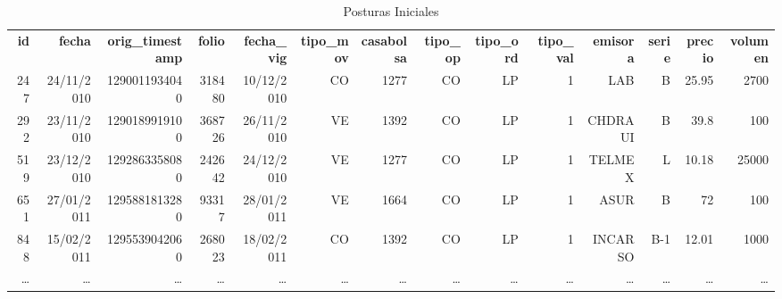 \documentclass[10pt]{article}
\begin{document}
\begin{landscape}

\begin{table}[htbp]\scriptsize
  \centering
  \caption{Posturas Iniciales}
 \setlength\tabcolsep{1.5pt}
    \begin{tabular}{rrrrrrrrrrrrrr}
   \textbf{ id}    & \textbf{fecha} & \textbf{orig\_timestamp} & \textbf{folio} & \textbf{fecha\_vig} & \textbf{tipo\_mov} & \textbf{casabolsa} & \textbf{tipo\_op} & \textbf{tipo\_ord} & \textbf{tipo\_val} & \textbf{emisora} & \textbf{serie} & \textbf{precio} & \textbf{volumen} \\
    247 & 24/11/2010 & 1290011934040 & 318480 & 10/12/2010 & CO    & 1277  & CO    & LP    & 1     & LAB   & B     & 25.95 & 2700 \\
    292 & 23/11/2010 & 1290189919100 & 368726 & 26/11/2010 & VE    & 1392  & CO    & LP    & 1     & CHDRAUI & B     & 39.8  & 100 \\
    519 & 23/12/2010 & 1292863358080 & 242642 & 24/12/2010 & VE    & 1277  & CO    & LP    & 1     & TELMEX & L     & 10.18 & 25000 \\
    651 & 27/01/2011 & 1295881813280 & 93317 & 28/01/2011 & VE    & 1664  & CO    & LP    & 1     & ASUR  & B     & 72    & 100 \\
    848 & 15/02/2011 & 1295539042060 & 268023 & 18/02/2011 & CO    & 1392  & CO    & LP    & 1     & INCARSO & B-1   & 12.01 & 1000 \\
    \ldots & \ldots & \ldots & \ldots & \ldots & \ldots & \ldots & \ldots & \ldots & \ldots & \ldots & \ldots & \ldots & \ldots \\
    \end{tabular}%
  \label{tab:posinicialesl}%
\end{table}%


\end{landscape}
\end{document}
